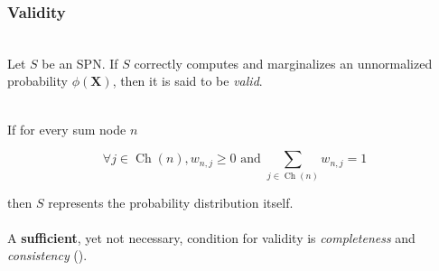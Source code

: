 \documentclass[usenames,dvipsnames]{beamer}
\DeclareMathOperator*{\Ch}{\text{Ch}}
\newcommand{\mbf}[1]{\mathbf{#1}}
\begin{document}
\begin{frame}
  \frametitle{Validity}

  \begin{definition}[Validity]~\\
    Let $S$ be an SPN. If $S$ correctly computes and marginalizes an unnormalized probability
    $\phi(\mbf{X})$, then it is said to be \emph{valid}.
  \end{definition}~\\

  If for every sum node $n$

  \begin{equation*}
    \forall j\in\Ch(n), w_{n,j} \geq 0\text{ and }\sum_{j\in\Ch(n)}w_{n,j} = 1
  \end{equation*}

  then $S$ represents the probability distribution itself.\\~\\

  A \textbf{sufficient}, yet not necessary, condition for validity is \emph{completeness} and
  \emph{consistency} (\cite{poon-domingos}).

\end{frame}
\end{document}
